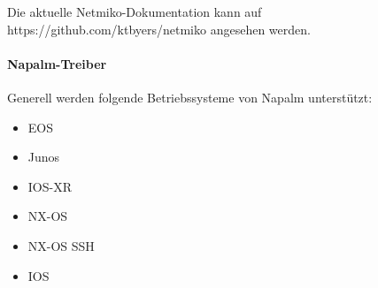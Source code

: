 \documentclass[]{subfiles}
\begin{document}
    Die aktuelle Netmiko-Dokumentation kann auf https://github.com/ktbyers/netmiko angesehen werden.
    
    
    \paragraph{Napalm-Treiber}
    Generell werden folgende Betriebssysteme von Napalm unterstützt:
    
    \begin{itemize}
        \item EOS 
        \item Junos
        \item IOS-XR
        \item NX-OS
        \item NX-OS SSH
        \item IOS
    \end{itemize}
    
\end{document}
